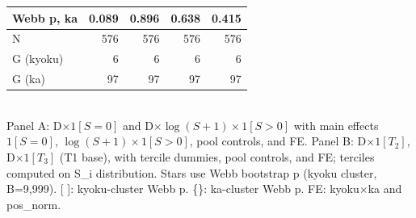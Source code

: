 \begin{table}[!htbp]
\begin{tabular}{lrrrr}
    {Webb p, ka} & {0.089} & {0.896} & {0.638} & {0.415} \\
    \hline
    N & 576 & 576 & 576 & 576 \\
    G (kyoku) & 6 & 6 & 6 & 6 \\
    G (ka) & 97 & 97 & 97 & 97 \\
    \hline\hline
  \end{tabular}
  \\[4pt]
  \footnotesize Panel A: D$\times 1[S=0]$ and D$\times\log(S+1)\times 1[S>0]$ with main effects $1[S=0]$, $\log(S+1)\times 1[S>0]$, pool controls, and FE. Panel B: D$\times 1[T_2]$, D$\times 1[T_3]$ (T1 base), with tercile dummies, pool controls, and FE; terciles computed on S\_i distribution. Stars use Webb bootstrap p (kyoku cluster, B=9,999). [ ]: kyoku-cluster Webb p. \{\}: ka-cluster Webb p. FE: kyoku$\times$ka and pos\_norm.
\end{table}
